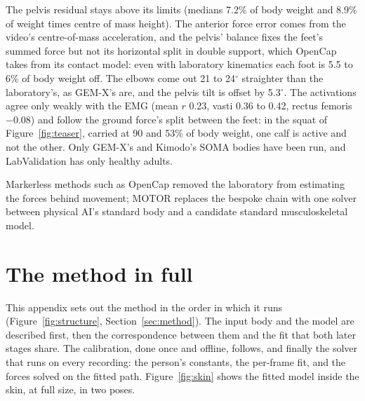 \documentclass[11pt]{article}
\newcommand{\dg}{\ensuremath{^\circ}}
\begin{document}
The pelvis residual stays above its limits (medians 7.2\% of body weight and 8.9\% of weight times centre of mass height). The anterior force error comes
from the video's centre-of-mass acceleration, and the pelvis' balance fixes the feet's summed force but not its
horizontal split in double support, which OpenCap takes from its contact model: even with laboratory kinematics each
foot is 5.5 to 6\% of body weight off. The elbows come out 21 to
24\dg{} straighter than the laboratory's, as GEM-X's are, and the pelvis tilt is offset by 5.3\dg. The
activations agree only weakly with the EMG (mean $r$ 0.23, vasti 0.36 to 0.42, rectus femoris $-0.08$) and follow the ground force's
split between the feet: in the squat of Figure~\ref{fig:teaser}, carried at 90 and 53\% of body weight, one calf is
active and not the other. Only GEM-X's and Kimodo's SOMA bodies have been run, and LabValidation has only healthy adults.

Markerless methods such as OpenCap removed the laboratory from estimating the forces behind movement; MOTOR replaces
the bespoke chain with one solver between physical AI's standard body and a candidate standard musculoskeletal model.

\FloatBarrier
\label{endofmain}




\clearpage
\appendix
\section{The method in full}
\label{app:method}

This appendix sets out the method in the order in which it runs (Figure~\ref{fig:structure}, Section~\ref{sec:method}). The input body and the
model are described first, then the correspondence between them and the fit that both later stages share. The
calibration, done once and offline, follows, and finally the solver that runs on every recording: the person's
constants, the per-frame fit, and the forces solved on the fitted path. Figure~\ref{fig:skin} shows
the fitted model inside the skin, at full size, in two poses.
\end{document}
